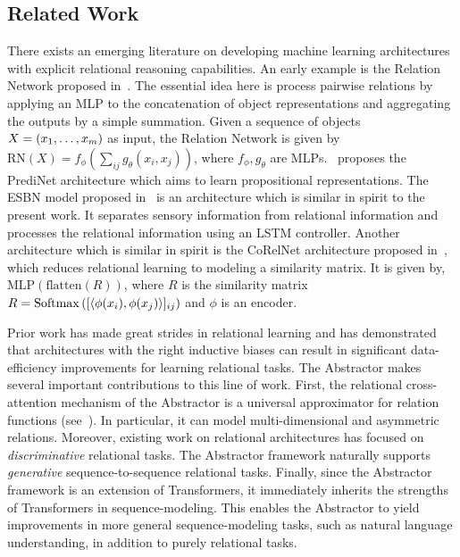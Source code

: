 \subsection{Related Work}

There exists an emerging literature on developing machine learning architectures with explicit relational reasoning capabilities. An early example is the Relation Network proposed in~\citep{santoro1}. The essential idea here is process pairwise relations by applying an MLP to the concatenation of object representations and aggregating the outputs by a simple summation. Given a sequence of objects $X = (x_1, \ldots, x_m)$ as input, the Relation Network is given by $\mathrm{RN}(X) = f_\phi(\sum_{ij} g_\theta(x_i, x_j))$, where $f_\phi, g_\theta$ are MLPs.~\citep{shanahanExplicitlyRelationalNeural} proposes the PrediNet architecture which aims to learn propositional representations. The ESBN model proposed in~\citep{esbn} is an architecture which is similar in spirit to the present work. It separates sensory information from relational information and processes the relational information using an LSTM controller. Another architecture which is similar in spirit is the CoRelNet architecture proposed in~\citep{kerg2022neural}, which reduces relational learning to modeling a similarity matrix. It is given by, $\mathrm{MLP}(\mathrm{flatten}(R))$, where $R$ is the similarity matrix $R = \mathrm{Softmax}\left([\left \langle \phi(x_i), \phi(x_j) \right\rangle]_{ij}\right)$ and $\phi$ is an encoder.

Prior work has made great strides in relational learning and has demonstrated that architectures with the right inductive biases can result in significant data-efficiency improvements for learning relational tasks. The Abstractor makes several important contributions to this line of work. First, the relational cross-attention mechanism of the Abstractor is a universal approximator for relation functions (see~). In particular, it can model multi-dimensional and asymmetric relations. Moreover, existing work on relational architectures has focused on \textit{discriminative} relational tasks. The Abstractor framework naturally supports \textit{generative} sequence-to-sequence relational tasks. Finally, since the Abstractor framework is an extension of Transformers, it immediately inherits the strengths of Transformers in sequence-modeling. This enables the Abstractor to yield improvements in more general sequence-modeling tasks, such as natural language understanding, in addition to purely relational tasks.